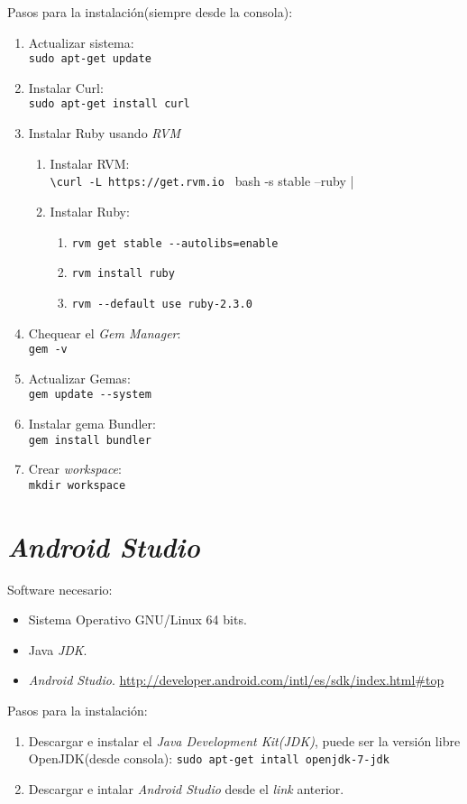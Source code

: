Pasos para la instalación(siempre desde la consola):

\begin{enumerate}
\item Actualizar sistema:\\ 
\verb|sudo apt-get update|
\item Instalar Curl:\\ 
\verb|sudo apt-get install curl|

\item Instalar Ruby usando \textit{RVM}
	\begin{enumerate}
	\item Instalar RVM:\\
	\verb|\curl -L https://get.rvm.io | bash -s stable --ruby |
	\item Instalar Ruby:
		\begin{enumerate}
		\item \verb|rvm get stable --autolibs=enable |
		\item \verb|rvm install ruby |
		\item \verb|rvm --default use ruby-2.3.0 |
		\end{enumerate}
	\end{enumerate}

\item Chequear el \textit{Gem Manager}:\\
\verb|gem -v|
\item Actualizar Gemas:\\
\verb|gem update --system|
\item Instalar gema Bundler:\\
\verb|gem install bundler|
\item Crear \textit{workspace}:\\
\verb|mkdir workspace|
\end{enumerate}
\newpage


\section{\textit{Android Studio}} %
Software necesario:
\begin{itemize}
\item Sistema Operativo GNU/Linux 64 bits.
\item Java \textit{JDK}.
\item \textit{Android Studio}. \href{url}{http://developer.android.com/intl/es/sdk/index.html\#top}
\end{itemize}

Pasos para la instalación:
\begin{enumerate}
\item Descargar e instalar el \textit{Java Development Kit(JDK)}, puede ser la versión libre OpenJDK(desde consola):
\verb|sudo apt-get intall openjdk-7-jdk|
\item Descargar e intalar \textit{Android Studio} desde el \textit{link} anterior.
\end{enumerate}

